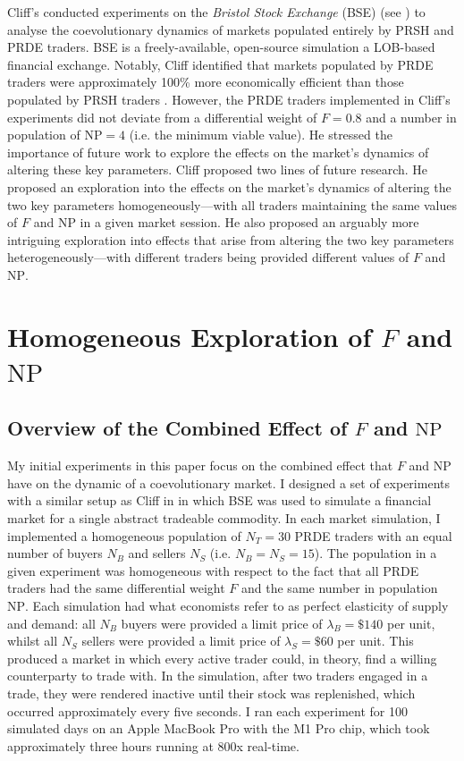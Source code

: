 \documentclass[conference]{IEEEtran}
\begin{document}
Cliff's conducted experiments on the \textit{Bristol Stock Exchange} (BSE) (see \cite{BSE, BSEPaper}) to analyse the coevolutionary dynamics of markets populated entirely by PRSH and PRDE traders.
BSE is a freely-available, open-source simulation a LOB-based financial exchange.
Notably, Cliff identified that markets populated by PRDE traders were approximately 100\% more economically efficient than those populated by PRSH traders \cite{PRDE}.
However, the PRDE traders implemented in Cliff's experiments did not deviate from a differential weight of $F=0.8$ and a number in population of $\mathrm{NP}=4$ (i.e. the minimum viable value).
He stressed the importance of future work to explore the effects on the market's dynamics of altering these key parameters.
Cliff proposed two lines of future research.
He proposed an exploration into the effects on the market's dynamics of altering the two key parameters homogeneously---with all traders maintaining the same values of $F$ and $\mathrm{NP}$ in a given market session.
He also proposed an arguably more intriguing exploration into effects that arise from altering the two key parameters heterogeneously---with different traders being provided different values of $F$ and $\mathrm{NP}$.

\section{Homogeneous Exploration of $F$ and $\mathrm{NP}$}

\subsection{Overview of the Combined Effect of $F$ and $\mathrm{NP}$}

My initial experiments in this paper focus on the combined effect that $F$ and $\mathrm{NP}$ have on the dynamic of a coevolutionary market.
I designed a set of experiments with a similar setup as Cliff in \cite{PRDE} in which BSE was used to simulate a financial market for a single abstract tradeable commodity.
In each market simulation, I implemented a homogeneous population of $N_T=30$ PRDE traders with an equal number of buyers $N_B$ and sellers $N_S$ (i.e. $N_B=N_S=15$).
The population in a given experiment was homogeneous with respect to the fact that all PRDE traders had the same differential weight $F$ and the same number in population $\mathrm{NP}$.
Each simulation had what economists refer to as perfect elasticity of supply and demand: all $N_B$ buyers were provided a limit price of $\lambda_B=\$140$ per unit, whilst all $N_S$ sellers were provided a limit price of $\lambda_S=\$60$ per unit.
This produced a market in which every active trader could, in theory, find a willing counterparty to trade with.
In the simulation, after two traders engaged in a trade, they were rendered inactive until their stock was replenished, which occurred approximately every five seconds.
I ran each experiment for 100 simulated days on an Apple MacBook Pro with the M1 Pro chip, which took approximately three hours running at 800x real-time.
\end{document}
